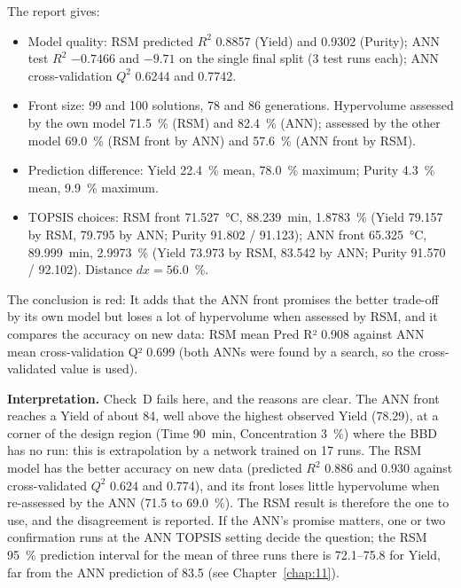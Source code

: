 The report gives:
\begin{itemize}
  \item Model quality: RSM predicted $R^2$ 0.8857 (Yield) and 0.9302 (Purity); ANN test $R^2$ $-0.7466$ and $-9.71$
        on the single final split (3 test runs each); ANN cross-validation $Q^2$ 0.6244 and 0.7742.
  \item Front size: 99 and 100 solutions, 78 and 86 generations. Hypervolume assessed by the own model 71.5~\% (RSM)
        and 82.4~\% (ANN); assessed by the other model 69.0~\% (RSM front by ANN) and 57.6~\% (ANN front by RSM).
  \item Prediction difference: Yield 22.4~\% mean, 78.0~\% maximum; Purity 4.3~\% mean, 9.9~\% maximum.
  \item TOPSIS choices: RSM front 71.527~°C, 88.239~min, 1.8783~\% (Yield 79.157 by RSM, 79.795 by ANN; Purity
        91.802 / 91.123); ANN front 65.325~°C, 89.999~min, 2.9973~\% (Yield 73.973 by RSM, 83.542 by ANN; Purity
        91.570 / 92.102). Distance $dx=56.0$~\%.
\end{itemize}
The conclusion is red:  It adds that
the ANN front promises the better trade-off by its own model but loses a lot of hypervolume when assessed by RSM,
and it compares the accuracy on new data: RSM mean Pred R² 0.908 against ANN mean cross-validation Q² 0.699 (both
ANNs were found by a search, so the cross-validated value is used).

\textbf{Interpretation.} Check~D fails here, and the reasons are clear. The ANN front reaches a Yield of about 84,
well above the highest observed Yield (78.29), at a corner of the design region (Time 90~min, Concentration 3~\%)
where the BBD has no run: this is extrapolation by a network trained on 17 runs. The RSM model has the better
accuracy on new data (predicted $R^2$ 0.886 and 0.930 against cross-validated $Q^2$ 0.624 and 0.774), and its front
loses little hypervolume when re-assessed by the ANN (71.5 to 69.0~\%). The RSM result is therefore the one to use,
and the disagreement is reported. If the ANN's promise matters, one or two confirmation runs at the ANN TOPSIS
setting decide the question; the RSM 95~\% prediction interval for the mean of three runs there is 72.1--75.8 for
Yield, far from the ANN prediction of 83.5 (see Chapter~\ref{chap:11}).

